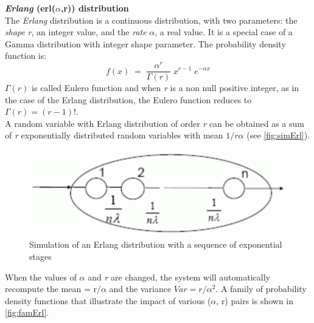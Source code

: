 \textbf{\emph{Erlang} (erl($\alpha$,r)) distribution}\\
The \emph{Erlang} distribution is a continuous distribution, with
two parameters: the \emph{shape} \emph{r}, an integer value, and the
\emph{rate}
$\alpha$, a real value. It is a special case of a Gamma
distribution with integer shape parameter. The probability density
function is:
\[
f(x)\; = \; \frac{\alpha^r}{\Gamma(r)} \; x^{r-1} \; e^{-\alpha x}
\]
$\Gamma(r)$ is called Eulero function and when \emph{r} is a non
null positive integer, as in the case of the Erlang distribution,
the Eulero function reduces to $\Gamma(r)= (r-1)!$.\\
A random variable with Erlang distribution of order \emph{r} can
be obtained as a sum of \emph{r} exponentially distributed random
variables with mean $1/r \alpha$ (see \autoref{fig:simErl}).
\begin{figure}[htb]
    \begin{center}
        \includegraphics[scale=.5]{img/jsimg/4.3.eps}
    \end{center}
    \caption{Simulation of an Erlang distribution with a sequence of exponential stages}
    \label{fig:simErl}
\end{figure}
When the values of $\alpha$ and \emph{r} are changed, the system
will automatically recompute the mean = r/$\alpha$ and the
variance $Var = r/\alpha^2$. A family of probability density
functions that illustrate the impact of various ($\alpha$, r)
pairs is shown in \autoref{fig:famErl}.
